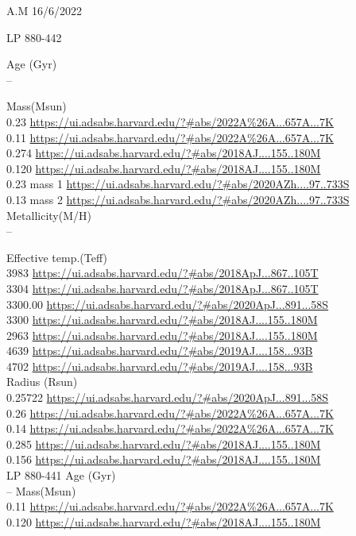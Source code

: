 A.M 16/6/2022

LP 880-442

Age (Gyr)\\
--

Mass(Msun)\\
0.23 \url{https://ui.adsabs.harvard.edu/?#abs/2022A%26A...657A...7K}\\
0.11 \url{https://ui.adsabs.harvard.edu/?#abs/2022A%26A...657A...7K}\\
0.274 \url{https://ui.adsabs.harvard.edu/?#abs/2018AJ....155..180M}\\
0.120 \url{https://ui.adsabs.harvard.edu/?#abs/2018AJ....155..180M}\\
0.23 mass 1 \url{https://ui.adsabs.harvard.edu/?#abs/2020AZh....97..733S}\\
0.13 mass 2 \url{https://ui.adsabs.harvard.edu/?#abs/2020AZh....97..733S}\\

Metallicity(M/H)\\
--

Effective temp.(Teff)\\
3983 \url{https://ui.adsabs.harvard.edu/?#abs/2018ApJ...867..105T}\\
3304 \url{https://ui.adsabs.harvard.edu/?#abs/2018ApJ...867..105T}\\
3300.00 \url{https://ui.adsabs.harvard.edu/?#abs/2020ApJ...891...58S}\\
3300 \url{https://ui.adsabs.harvard.edu/?#abs/2018AJ....155..180M}\\
2963 \url{https://ui.adsabs.harvard.edu/?#abs/2018AJ....155..180M}\\
4639 \url{https://ui.adsabs.harvard.edu/?#abs/2019AJ....158...93B}\\
4702 \url{https://ui.adsabs.harvard.edu/?#abs/2019AJ....158...93B}\\

Radius (Rsun)\\
0.25722 \url{https://ui.adsabs.harvard.edu/?#abs/2020ApJ...891...58S}\\
0.26 \url{https://ui.adsabs.harvard.edu/?#abs/2022A%26A...657A...7K}\\
0.14 \url{https://ui.adsabs.harvard.edu/?#abs/2022A%26A...657A...7K}\\
0.285 \url{https://ui.adsabs.harvard.edu/?#abs/2018AJ....155..180M}\\
0.156 \url{https://ui.adsabs.harvard.edu/?#abs/2018AJ....155..180M}\\

LP 880-441
Age (Gyr)\\
--
Mass(Msun)\\
0.11 \url{https://ui.adsabs.harvard.edu/?#abs/2022A%26A...657A...7K}\\
0.120 \url{https://ui.adsabs.harvard.edu/?#abs/2018AJ....155..180M}\\

